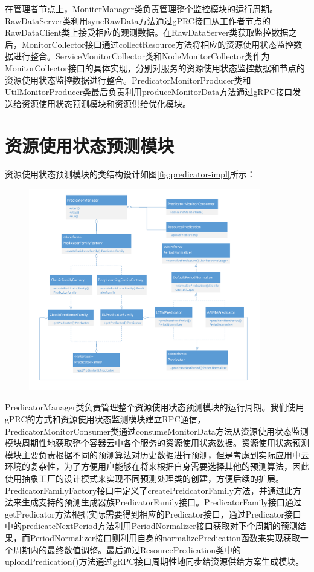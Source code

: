 在管理者节点上，MoniterManager类负责管理整个监控模块的运行周期。RawDataServer类利用syncRawData方法通过gPRC接口从工作者节点的RawDataClient类上接受相应的观测数据。在RawDataServer类获取监控数据之后，MonitorCollector接口通过collectResource方法将相应的资源使用状态监控数据进行整合。ServiceMonitorCollector类和NodeMonitorCollector类作为MonitorCollector接口的具体实现，分别对服务的资源使用状态监控数据和节点的资源使用状态监控数据进行整合。PredicatorMonitorProducer类和UtilMonitorProducer类最后负责利用produceMonitorData方法通过gRPC接口发送给资源使用状态预测模块和资源供给优化模块。

\section{资源使用状态预测模块}
资源使用状态预测模块的类结构设计如图\ref{fig:predicator-impl}所示：
\begin{figure}[H]
\centering
\includegraphics[width=0.9\textwidth]{./figure/predicator_impl}
\end{figure}
PredicatorManager类负责管理整个资源使用状态预测模块的运行周期。我们使用gPRC的方式和资源使用状态监测模块建立RPC通信，PredicatorMonitorConsumer类通过consumeMonitorData方法从资源使用状态监测模块周期性地获取整个容器云中各个服务的资源使用状态数据。资源使用状态预测模块主要负责根据不同的预测算法对历史数据进行预测，但是考虑到实际应用中云环境的复杂性，为了方便用户能够在将来根据自身需要选择其他的预测算法，因此使用抽象工厂的设计模式来实现不同预测处理类的创建，方便后续的扩展。PredicatorFamilyFactory接口中定义了createPreidcatorFamily方法，并通过此方法来生成支持的预测生成器族PredicatorFamily接口。PredicatorFamily接口通过getPredicator方法根据实际需要得到相应的Predicator接口，通过Predicator接口中的predicateNextPeriod方法利用PeriodNormalizer接口获取对下个周期的预测结果，而PeriodNormalizer接口则利用自身的normalizePredication函数来实现获取一个周期内的最终数值调整。最后通过ResourcePredication类中的uploadPredication()方法通过gRPC接口周期性地同步给资源供给方案生成模块。

